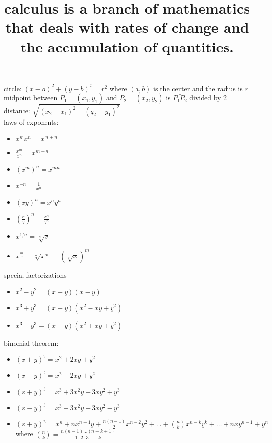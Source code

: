 \documentclass{article}
\begin{document}
\title{calculus is a branch of mathematics that deals with rates of change and the accumulation of quantities.}

\maketitle


circle: $(x-a)^2 + (y-b)^2 = r^2$ where $(a, b)$ is the center and the radius is $r$\\

midpoint between $P_1 = (x_1, y_1)$ and $P_2 = (x_2, y_2)$ is $\bar{P_{1}P_2}$ divided by 2\\

distance: $\sqrt{(x_2 - x_1)^2 + (y_2 - y_1)^2}$\\

laws of exponents: 

	\begin{itemize}
		\item $x^mx^n = x^{m+n}$
		\item $\frac{x^m}{x^n} = x^{m-n}$
		\item $(x^m)^n = x^{mn}$
		\item $x^{-n} = \frac{1}{x^n}$
		\item $(xy)^n = x^ny^n$
		\item $(\frac{x}{y})^n = \frac{x^n}{y^n}$
		\item $x^{1/n} = \sqrt[n]{x}$
		\item $x^{\frac{m}{n}} = \sqrt[n]{x^m} = (\sqrt[n]{x})^m$
	\end{itemize}

special factorizations

	\begin{itemize}
		\item $x^2 - y^2 = (x + y)(x - y)$
		\item $x^3 + y^3 = (x + y)(x^2 - xy + y^2)$
		\item $x^3 - y^3 = (x - y)(x^2 + xy + y^2)$
	\end{itemize}

binomial theorem:

	\begin{itemize}
		\item $(x + y)^2 = x^2 + 2xy + y^2$
		\item $(x - y)^2 = x^2 - 2xy + y^2$
		\item $(x + y)^3 = x^3 + 3x^2y + 3xy^2 + y^3$
		\item $(x - y)^3 = x^3 - 3x^2y + 3xy^2 - y^3$
		\item $(x + y)^n = x^n + nx^{n-1}y + \frac{n(n-1)}{2}x^{n-2}y^2 + \ldots + \binom{n}{k}x^{n-k}y^k + \dots + nxy^{n-1} + y^n$
			where $\binom{n}{k} = \frac{n(n-1) \dots (n-k+1)}{1 \cdot 2 \cdot 3 \cdot \ldots \cdot k}$
	\end{itemize}
\end{document}
